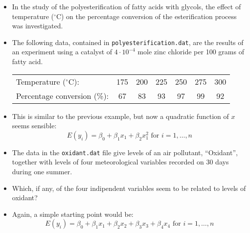 \begin{frame}
  \begin{itemize}
    \vspace{0.25cm}
    \item In the study of the polyesterification of fatty acids with glycols, the effect of temperature ($ ^\circ $C) on the percentage conversion of the esterification process was investigated.
    \item The following data, contained in \texttt{polyesterification.dat}, are the results of an experiment using a catalyst of $ 4 \cdot 10^{-4} $ mole zinc chloride per 100 grams of fatty acid.
      \vspace{0.2cm}
      \begin{small}
        \begin{tabular}{lcccccc}
          \hline
          Temperature ($ ^\circ $C): & 175&200&225&250&275&300\\
          Percentage conversion (\%): & 67&83&93&97&99&92\\
          \hline
        \end{tabular}       
      \end{small}
    \vspace{0.25cm}
    \item This is similar to the previous example, but now a quadratic function of $x$ seems sensible:
      $$ E(y_i) = \beta_0 + \beta_1 x_1 + \beta_2 x_1^2 \text{  for } i = 1, \dots, n $$
  \end{itemize}
\end{frame}




\begin{frame}
  \begin{itemize}
    \vspace{0.5cm}
    \item The data in the \texttt{oxidant.dat} file give levels of an air pollutant, ``Oxidant'', together with levels of four meteorological variables recorded on 30 days during one summer.
    \vspace{0.5cm}
    \item Which, if any, of the four indipendent variables seem to be related to levels of oxidant?
    \vspace{0.5cm}
    \item Again, a simple starting point would be:
      $$ E(y_i) = \beta_0 + \beta_1 x_1 + \beta_2 x_2 + \beta_3 x_3 + \beta_4 x_4 \text{  for } i = 1, \dots, n $$
  \end{itemize}
\end{frame}



